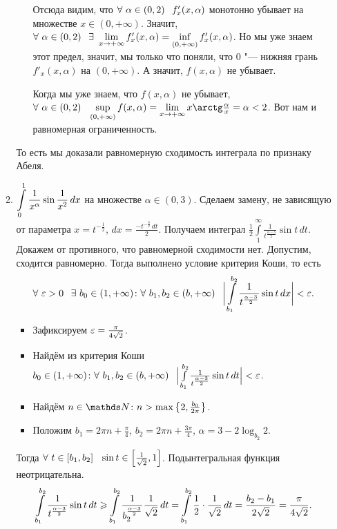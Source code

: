 \documentclass{article}
\begin{document}
\begin{enumerate}
\begin{enumerate}
\begin{itemize}
Отсюда видим, что $\forall\ \alpha\in(0,2)\pau f'_x(x,\alpha)$ монотонно убывает  на множестве $x\in(0,+\infty)$. Значит, $\forall\ \alpha\in(0,2)\pau \exists\ \yo x{+\infty}f'_x(x,\alpha)=\inf\limits_{(0,+\infty)}f'_x(x,\alpha)$. Но мы уже знаем этот предел, значит, мы только что поняли, что $0$ "--- нижняя грань $f'_x(x,\alpha)$ на $(0,+\infty)$. А значит, $f(x,\alpha)$ не убывает.

Когда мы уже знаем, что $f(x,\alpha)$ не убывает, $\forall\ \alpha\in(0,2)\pau \sup\limits_{(0,+\infty)}f(x,\alpha)\hm=\yo x{+\infty} x\arctg\frac{\alpha}x=\alpha<2$. Вот нам и равномерная ограниченность.
\end{itemize}
То есть мы доказали равномерную сходимость интеграла по признаку Абеля.

\item $\displaystyle\int\limits_0^1\frac1{x^{\alpha}}\sin\frac1{x^2}\,dx$ на множестве $\alpha\in(0,3)$. Сделаем замену, не зависящую от параметра $x=t^{-\frac12}$, $dx=\frac{-t^{-\frac32}\,dt}2$. Получаем интеграл $\frac12\int\limits_1^{\infty}\frac1{t^{\frac{\alpha-3}2}}\sin t\,dt$. Докажем от противного, что равномерной сходимости нет. Допустим, сходится равномерно. Тогда выполнено условие критерия Коши, то есть
\[\forall\ \e>0\pau\exists\ b_0\in(1,+\infty)\colon\forall\ b_1,b_2\in(b,+\infty)\pau \bigg|\intop_{b_1}^{b_2}\frac1{t^{\frac{\alpha-3}2}}\sin t\,dx\bigg|<\e.\]
\begin{itemize}
\item Зафиксируем $\varepsilon=\frac{\pi}{4\sqrt 2}$.
\item Найдём из критерия Коши $b_0\in(1,+\infty)\colon \forall\ b_1,b_2\in(b,+\infty)\pau \Big|\int\limits_{b_1}^{b_2}\frac1{t^{\frac{\alpha-3}2}}\sin t\,dt\Big|<\e$.
\item Найдём $n\in\N\colon n>\max\left\{2,\frac{b_0}{2\pi}\right\}$.
\item Положим $b_1=2\pi n+\frac{\pi}4$, $b_2=2\pi n+\frac{3\pi}4$, $\alpha=3-2\log_{b_2}2$.
\end{itemize}
Тогда $\forall\ t\in[b_1,b_2]\pau \sin t\in\left[\frac1{\sqrt2},1\right]$. Подынтегральная функция неотрицательна.
\[\intop_{b_1}^{b_2}\frac1{t^{\frac{\alpha-3}2}}\sin t\,dt\ge\intop_{b_1}^{b_2}\frac1{b_2^{\frac{\alpha-3}2}}\frac1{\sqrt2}\,dt=\intop_{b_1}^{b_2}\frac12\cdot\frac1{\sqrt 2}\,dt=\frac{b_2-b_1}{2\sqrt 2}=\frac{\pi}{4\sqrt 2}.\]

\end{enumerate}
\end{enumerate}
\end{document}
